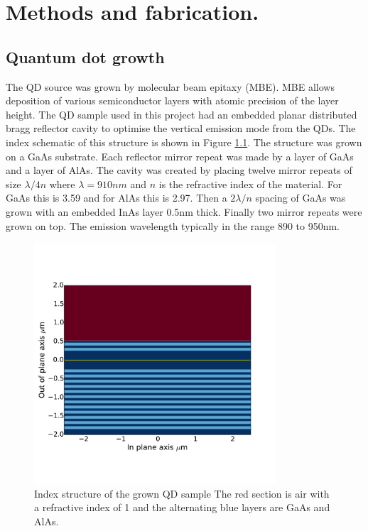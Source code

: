 

\chapter{Methods and fabrication.}

\section{Quantum dot growth}

The QD source was grown by molecular beam epitaxy (MBE). MBE allows deposition
of various semiconductor layers with atomic precision of the layer height. The
QD sample used in this project had an embedded planar distributed bragg
reflector cavity to optimise the vertical emission mode from the QDs. The index
schematic of this structure is shown in Figure \ref{fig:planar_cav}. The
structure was grown on a GaAs substrate. Each reflector mirror repeat was made
by a layer of GaAs and a layer of AlAs. The cavity was created by placing twelve
mirror repeats of size $\lambda/4n$ where $\lambda = 910nm$ and $n$ is the
refractive index of the material. For GaAs this is 3.59 and for AlAs this is
2.97. Then a $2\lambda/n$ spacing of GaAs was grown with an embedded InAs layer
0.5nm thick. Finally two mirror repeats were grown on top. The emission
wavelength typically in the range 890 to 950nm.

\begin{figure}[h!] \begin{center}
\includegraphics[width=0.8\textwidth]{images/qd_layers.pdf} \end{center}
\caption{Index structure of the grown QD sample The red section is air with a
refractive index of 1 and the alternating blue layers are GaAs and AlAs.}
\label{fig:planar_cav} \end{figure}

